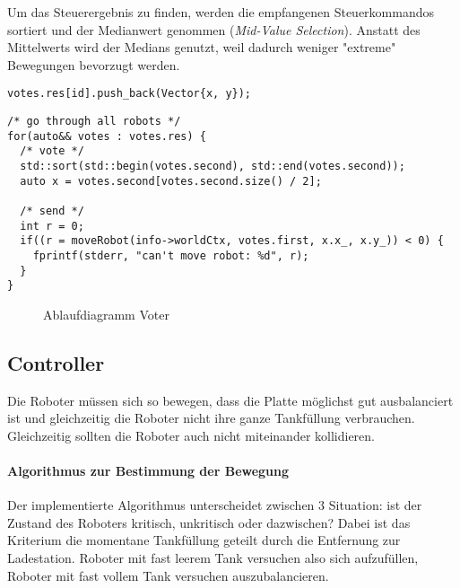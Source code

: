 {Um das Steuerergebnis zu finden, werden die empfangenen Steuerkommandos sortiert und der Medianwert genommen 
(\textit{Mid-Value Selection}). Anstatt des Mittelwerts wird der Medians genutzt, weil dadurch weniger "extreme"
Bewegungen bevorzugt werden.
\noindent\begin{minipage}{.30\textwidth}
	\begin{lstlisting}[caption=Sammeln, frame=tlrb, language={[11]C++}]
votes.res[id].push_back(Vector{x, y});
\end{lstlisting}
\end{minipage}\hfill
\begin{minipage}{.60\textwidth}
\begin{lstlisting}[caption=Auswahl, frame=tlrb, language={[11]C++}]
/* go through all robots */
for(auto&& votes : votes.res) {
  /* vote */
  std::sort(std::begin(votes.second), std::end(votes.second));
  auto x = votes.second[votes.second.size() / 2];

  /* send */
  int r = 0;
  if((r = moveRobot(info->worldCtx, votes.first, x.x_, x.y_)) < 0) {
  	fprintf(stderr, "can't move robot: %d", r);
  }
}
\end{lstlisting}
\end{minipage}


\begin{figure}
	\centering
	\caption{Ablaufdiagramm Voter}
	\label{fig:sequence-voter}
\end{figure}

\subsection{Controller}\label{controller}
Die Roboter m{\"{u}}ssen sich so bewegen, dass die Platte m{\"{o}}glichst gut ausbalanciert
ist und gleichzeitig die Roboter nicht ihre ganze Tankf{\"{u}}llung verbrauchen. Gleichzeitig sollten
die Roboter auch nicht miteinander kollidieren.

\paragraph{Algorithmus zur Bestimmung der Bewegung} Der implementierte Algorithmus unterscheidet zwischen 3
Situation: ist der Zustand des Roboters kritisch,
unkritisch oder dazwischen? Dabei ist das Kriterium die momentane Tankf{\"{u}}llung geteilt durch die Entfernung zur Ladestation. Roboter mit fast leerem Tank
versuchen also sich aufzuf{\"{u}}llen, Roboter mit fast vollem Tank versuchen auszubalancieren.

}
